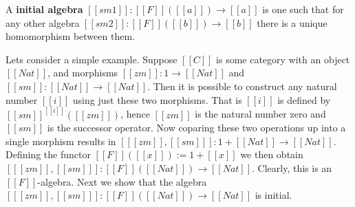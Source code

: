 \begin{definition}
  \label{def:initial_algebras}
  A \textbf{initial algebra} $[[sm1]] : [[F]]([[a]]) \to [[a]]$ is one such that for any other algebra 
  $[[sm2]] : [[F]]([[b]]) \to [[b]]$ there is a unique homomorphism between them.
\end{definition}

Lets consider a simple example.  Suppose $[[C]]$ is some category with an object $[[Nat]]$, and morphisms
$[[zm]] : 1 \to [[Nat]]$ and $[[sm]] : [[Nat]] \to [[Nat]]$.  Then it is possible to construct any natural number
$[[i]]$ using just these two morphisms.  That is $[[i]]$ is defined by $[[sm]]^{[[i]]}([[zm]])$, hence $[[zm]]$ is 
the natural number zero and $[[sm]]$ is the successor operator.  Now coparing these two operations up into a single
morphism results in $[ [[zm]],[[sm]] ] : 1 + [[Nat]] \to [[Nat]]$.  Defining the functor $[[F]]([[x]]) := 1 + [[x]]$ 
we then obtain $[ [[zm]],[[sm]] ] : [[F]]([[Nat]]) \to [[Nat]]$.  Clearly, this is an $[[F]]$-algebra.  Next we show
that the algebra $[ [[zm]],[[sm]] ] : [[F]]([[Nat]]) \to [[Nat]]$ is initial.

